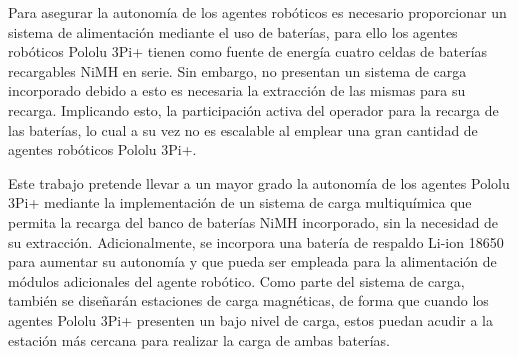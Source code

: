 Para asegurar la autonomía de los agentes robóticos es necesario proporcionar un sistema
de alimentación mediante el uso de baterías, para ello los agentes robóticos Pololu 3Pi+
 tienen como fuente de energía cuatro celdas de 
 baterías recargables NiMH en serie. Sin embargo, no presentan un sistema de
 carga incorporado debido a esto es necesaria la extracción de las mismas para 
 su recarga. Implicando esto, la participación activa del operador
 para la recarga de las baterías, lo cual a su vez no es escalable  al emplear una gran cantidad de
 agentes robóticos Pololu 3Pi+.

Este trabajo pretende llevar a un mayor grado la autonomía de los agentes Pololu 3Pi+ mediante
la implementación de un sistema de carga multiquímica que permita la recarga del banco de baterías
NiMH incorporado, sin la necesidad de su extracción. Adicionalmente, se incorpora una batería de 
respaldo Li-ion 18650 para aumentar su autonomía y que pueda ser empleada para la alimentación de módulos
adicionales del agente robótico. Como parte del sistema de carga, también se diseñarán estaciones de carga
magnéticas, de forma que cuando los agentes Pololu 3Pi+ presenten un bajo nivel de carga, estos puedan acudir 
a la estación más cercana para realizar la carga de ambas baterías. 